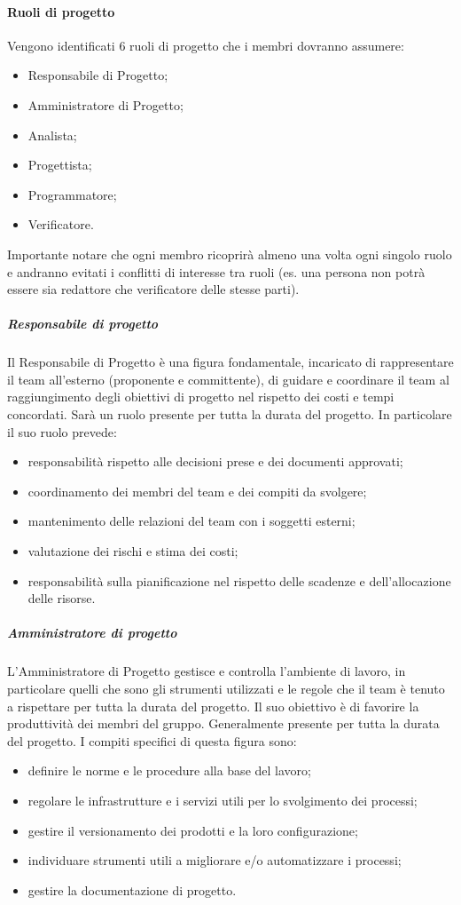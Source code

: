 \paragraph{Ruoli di progetto}
Vengono identificati 6 ruoli di progetto che i membri dovranno assumere:

\begin{itemize}
\item Responsabile di Progetto;
\item Amministratore di Progetto;
\item Analista;
\item Progettista;
\item Programmatore;
\item Verificatore.
\end{itemize}

Importante notare che ogni membro ricoprirà almeno una volta ogni singolo ruolo e andranno evitati i conflitti di interesse tra ruoli (es. una persona non potrà essere sia redattore che verificatore delle stesse parti).

\subparagraph{Responsabile di progetto}
Il Responsabile di Progetto è una figura fondamentale, incaricato di rappresentare il team all'esterno (proponente e committente), di guidare e coordinare il team al raggiungimento degli obiettivi di progetto nel rispetto dei costi e tempi concordati. Sarà un ruolo presente per tutta la durata del progetto.
In particolare il suo ruolo prevede:
\begin{itemize}
\item responsabilità rispetto alle decisioni prese e dei documenti approvati;
\item coordinamento dei membri del team e dei compiti da svolgere;
\item mantenimento delle relazioni del team con i soggetti esterni;
\item valutazione dei rischi e stima dei costi;
\item responsabilità sulla pianificazione nel rispetto delle scadenze e dell'allocazione delle risorse.
\end{itemize}


\subparagraph{Amministratore di progetto}
L'Amministratore di Progetto gestisce e controlla l'ambiente di lavoro, in particolare quelli che sono gli strumenti utilizzati e le regole che il team è tenuto a rispettare per tutta la durata del progetto. Il suo obiettivo è di favorire la produttività dei membri del gruppo. Generalmente presente per tutta la durata del progetto.
I compiti specifici di questa figura sono:
\begin{itemize}
\item definire le norme e le procedure alla base del lavoro;
\item regolare le infrastrutture e i servizi utili per lo svolgimento dei processi;
\item gestire il versionamento dei prodotti e la loro configurazione;
\item individuare strumenti utili a migliorare e/o automatizzare i processi;
\item gestire la documentazione di progetto.
\end{itemize}

